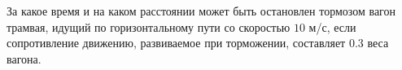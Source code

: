 За какое время и на каком расстоянии может быть остановлен тормозом
вагон трамвая, идущий по горизонтальному пути со скоростью $10$ м/с,
если сопротивление движению, развиваемое при торможении, составляет
$0.3$ веса вагона.
